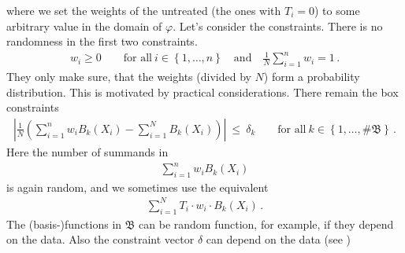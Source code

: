 where we set the weights of the untreated (the ones with $T_i=0$) to some arbitrary value in the domain of $\varphi$.
Let's consider the constraints. There is no randomness in the first two constraints.
\begin{gather*}
    w_i 
    \ge
    0
    \qquad
    \text{for all}\ 
    i \in \left\{ 1, \ldots, n \right\}
    \quad
    \text{and}
    \quad
    \frac{1}{N}
    \sum_{i=1}^{n} 
    w_i
    =1
    \,.
\end{gather*}
They only make sure, that the weights (divided by $N$) form a probability distribution.
This is motivated by practical considerations.
There remain the box constraints
\begin{gather*}
    \left| 
      \frac{1}{N} 
      \left( 
      \sum_{i = 1}^{n} 
      w_i
      B_k(X_i)
      -
      \sum_{i=1}^{N} 
      B_k(X_i)
      \right)
    \right|
    \ 
    \le 
    \ 
    \delta_k
    \qquad
    \text{for all}\ 
    k \in \left\{ 1, \ldots, \# \mathfrak{B} \right\}
    \,.
\end{gather*}
Here the number of summands in
\begin{gather*}
      \sum_{i = 1}^{n} 
      w_i
      B_k(X_i)
\end{gather*}
is again random, and we sometimes use the equivalent
\begin{gather*}
      \sum_{i = 1}^{N} 
      T_i
      \cdot
      w_i
      \cdot
      B_k(X_i)
      \,.
\end{gather*}
The (basis-)functions in $\mathfrak{B}$ can be random function, for example, if they depend on the data.
Also the constraint vector $\delta$ can depend on the data (see \cite[Algorithm~1 on page 11]{Wang2019}) 
